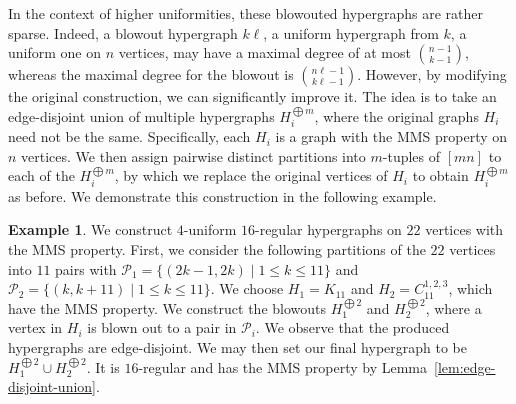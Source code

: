 \documentclass[12pt,UKenglish]{amsart}
\theoremstyle{plain}
\theoremstyle{definition}
\newtheorem{example}[thm]{Example}
\theoremstyle{remark}
\begin{document}
 In the context of higher uniformities, these blowouted hypergraphs are rather sparse. Indeed, a blowout hypergraph $k\ell$, a uniform hypergraph from $k$, a uniform one on $n$ vertices, may have a maximal degree of at most $\binom{n-1}{k-1}$, whereas the maximal degree for the blowout is $\binom{n\ell -1}{k\ell -1}$.
 However, by modifying the original construction, we can significantly improve it.
 The idea is to take an edge-disjoint union of multiple hypergraphs $H_i^{\bigoplus m}$, where the original graphs $H_i$ need not be the same.
 Specifically, each $H_i$ is a graph with the MMS property on $n$ vertices.
 We then assign pairwise distinct partitions into $m$-tuples of $[mn]$ to each of the $H_i^{\bigoplus m}$, by which we replace the original vertices of $H_i$ to obtain $H_i^{\bigoplus m}$ as before.
 We demonstrate this construction in the following example.
\begin{example}
  We construct $4$-uniform $16$-regular hypergraphs on $22$ vertices with the MMS property.
 First, we consider the following partitions of the $22$ vertices into $11$ pairs with $\mathcal{P}_1=\{(2k-1,2k)\mid 1\leq k\leq 11\}$ and $\mathcal{P}_2=\{(k,k+11)\mid 1\le k\leq 11\}$.
 We choose $H_1=K_{11}$ and $H_2=C_{11}^{1,2,3}$, which have the MMS property.
 We construct the blowouts $H_1^{\bigoplus2}$ and $H_2^{\bigoplus2}$, where a vertex in $H_i$ is blown out to a pair in $\mathcal{P}_i$.
 We observe that the produced hypergraphs are edge-disjoint. We may then set our final hypergraph to be $H_1^{\bigoplus2}\cup H_2^{\bigoplus2}$. It is $16$-regular and has the MMS property by Lemma~\ref{lem:edge-disjoint-union}.
 \end{example}
\end{document}
